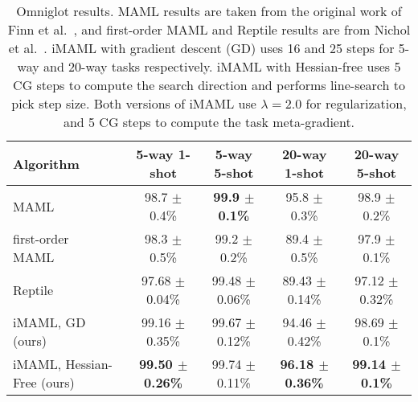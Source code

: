 \documentclass{article} \usepackage[nonatbib, final]{mod_neurips}
\begin{document}
\begin{table}[t!]
\label{table:omniglot_results}
\begin{center}
\caption{\footnotesize Omniglot results. MAML results are taken from the original work of Finn et al.~\cite{maml}, and first-order MAML and Reptile results are from Nichol et al.~\cite{nichol2018first}. iMAML with gradient descent (GD) uses 16 and 25 steps for 5-way and 20-way tasks respectively. iMAML with Hessian-free uses 5 CG steps to compute the search direction and performs line-search to pick step size. Both versions of iMAML use $\lambda=2.0$ for regularization, and 5 CG steps to compute the task meta-gradient.}  \vspace*{5pt}
\footnotesize
\renewcommand{\arraystretch}{1.1}
\begin{tabular}{l|c|c|c|c}
\toprule
Algorithm    & 5-way 1-shot     & 5-way 5-shot   & 20-way 1-shot  & 20-way 5-shot  \\ \midrule
MAML~\cite{maml}        & 98.7 $\pm$ 0.4\% & \textbf{99.9 $\pm$ 0.1\%}   & 95.8 $\pm$ 0.3\%   & 98.9 $\pm$ 0.2\%   \\ \hline
first-order MAML~\cite{maml}       & 98.3 $\pm$ 0.5\%     & 99.2 $\pm$ 0.2\%   & 89.4 $\pm$ 0.5\%   & 97.9 $\pm$ 0.1\%   \\ \hline
Reptile~\cite{nichol2018first}      & 97.68 $\pm$ 0.04\%   & 99.48 $\pm$ 0.06\% & 89.43 $\pm$ 0.14\% & 97.12 $\pm$ 0.32\% \\ \hline
iMAML, GD (ours) & 99.16 $\pm$ 0.35\% & 99.67 $\pm$ 0.12\% & 94.46 $\pm$ 0.42\%  & 98.69 $\pm$ 0.1\%  \\ \hline
iMAML, Hessian-Free (ours) & \textbf{99.50 $\pm$ 0.26\%}    & 99.74 $\pm$ 0.11\% & \textbf{96.18 $\pm$ 0.36\%} & \textbf{99.14 $\pm$ 0.1\%}  \\ \bottomrule
\end{tabular}
\end{center}
\vspace{-0.1cm}
\end{table}
\end{document}
